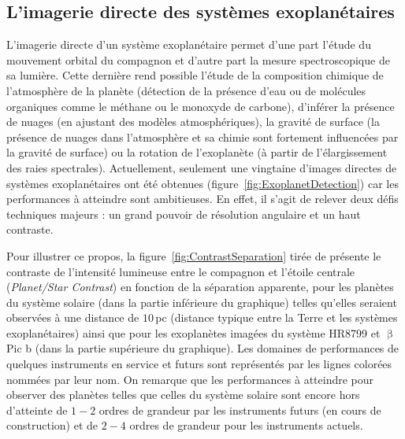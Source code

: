 \subsection{L'imagerie directe des systèmes exoplanétaires}
\label{sec:ImagerieDirecte}

L'imagerie directe d'un système exoplanétaire permet d'une part l'étude du mouvement orbital du compagnon \citep{chauvin2012, wang2018} et d'autre part la mesure spectroscopique de sa lumière. Cette dernière rend possible l'étude de la composition chimique de l'atmosphère de la planète (détection de la présence d'eau ou de molécules organiques comme le méthane ou le monoxyde de carbone), d'inférer la présence de nuages \citep{marley2015} (en ajustant des modèles atmosphériques), la gravité de surface \citep{marley2012} (la présence de nuages dans l'atmosphère et sa chimie sont fortement influencées par la gravité de surface) ou la rotation de l'exoplanète \citep{bryan2020} (à partir de l'élargissement des raies spectrales). Actuellement, seulement une vingtaine d'images directes de systèmes exoplanétaires ont été obtenues (figure~\ref{fig:ExoplanetDetection}) car les performances à atteindre sont ambitieuses. En effet, il s'agit de relever deux défis techniques majeurs : un grand pouvoir de résolution angulaire et un haut contraste.

Pour illustrer ce propos, la figure~\ref{fig:ContrastSeparation} tirée de \cite{mawet2012} présente le contraste de l'intensité lumineuse entre le compagnon et l'étoile centrale (\textit{Planet/Star Contrast}) en fonction de la séparation apparente, pour les planètes du système solaire (dans la partie inférieure du graphique) telles qu'elles seraient observées à une distance de $10 \,$pc (distance typique entre la Terre et les systèmes exoplanétaires) ainsi que pour les exoplanètes imagées du système HR8799 \citep{marois2008} et $\upbeta$ Pic b \citep{lagrange2010} (dans la partie supérieure du graphique). Les domaines de performances de quelques instruments en service et futurs sont représentés par les lignes colorées nommées par leur nom. On remarque que les performances à atteindre pour observer des planètes telles que celles du système solaire sont encore hors d'atteinte de $1-2$ ordres de grandeur par les instruments futurs (en cours de construction) et de $2-4$ ordres de grandeur pour les instruments actuels.

